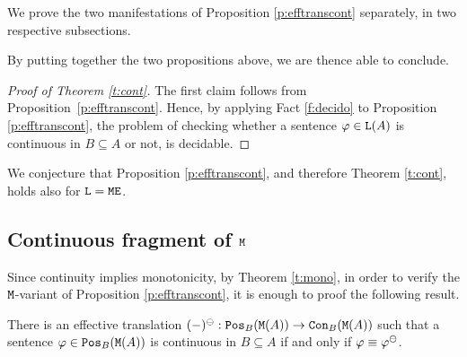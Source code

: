 We prove the two manifestations of Proposition \ref{p:efftranscont} separately,
in two respective subsections.

By putting together the two propositions above, we are thence able to conclude.
\begin{proof}[Proof of Theorem \ref{t:cont}]
The first claim follows from  Proposition~\ref{p:efftranscont}. 
Hence, by applying Fact \ref{f:decido} to Proposition \ref{p:efftranscont}, the 
problem of checking whether a sentence $\phi \in \llang(A)$ is continuous in 
$B \subseteq A$ or not, is decidable.
\end{proof}

We conjecture that Proposition \ref{p:efftranscont}, and therefore
Theorem \ref{t:cont}, holds also for $\llang=\ofoe$.

\subsection{Continuous fragment of $\ofo$}\label{subsec:conofo}

Since continuity implies monotonicity, by Theorem \ref{t:mono}, in order to 
verify the $\ofo$-variant of Proposition \ref{p:efftranscont}, it is enough to
proof the following result.

\begin{proposition}\label{prop:ofocont}
There is an effective translation $(-)^\tcont:\monot{\ofo(A)}{B} \to 
\cont{\ofo(A)}{B}$ such that a sentence $\phi \in \monot{\ofo(A)}{B}$ is
continuous in $B \subseteq A$ if and only if $\phi\equiv \phi^\tcont$.
\end{proposition}

